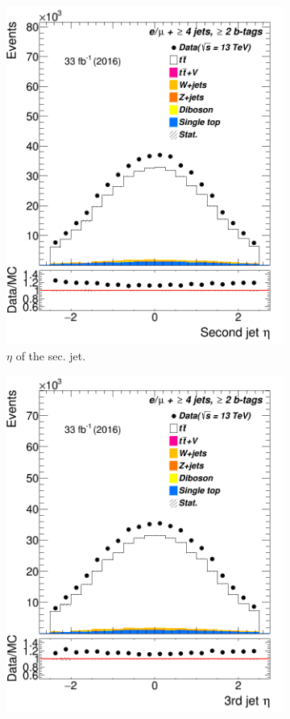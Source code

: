 \begin{figure}
\begin{subfigure}{0.25\textwidth}
	\includegraphics[width=\linewidth]{ControlPlots_emujets_2016_4incl_2incl/jet1_eta_emujets_2016.png}
	\caption{$\eta$ of the sec. jet.} \label{figSec23}
\end{subfigure}
\begin{subfigure}{0.25\textwidth}
	\includegraphics[width=\linewidth]{ControlPlots_emujets_2016_4incl_2incl/jet2_eta_emujets_2016.png}

\end{subfigure}
\end{figure}
